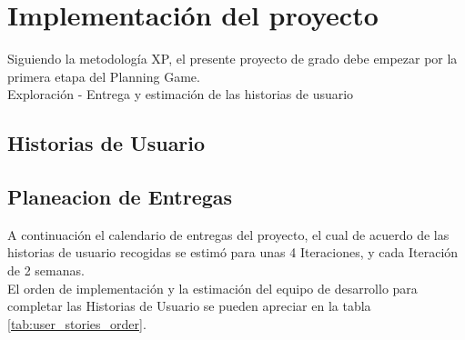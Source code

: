 




  \section{Implementación del proyecto}
  \label{sec:implementacion}

  Siguiendo la metodología XP, el presente proyecto de grado debe empezar por la primera etapa del Planning Game.\\



  Exploración - Entrega y estimación de las historias de usuario

    \subsection{Historias de Usuario}
    \label{sub:historias_de_usuario}

      


    \subsection{Planeacion de Entregas}
    \label{sub:Planeacion de Entregas}

        A continuación el calendario de entregas del proyecto, el cual de acuerdo de las historias de usuario recogidas se estimó para unas 4 Iteraciones, y cada Iteración de 2 semanas.\\

        

        El orden de implementación y la estimación del equipo de desarrollo para completar las Historias de Usuario se pueden apreciar en la tabla \ref{tab:user_stories_order}.

